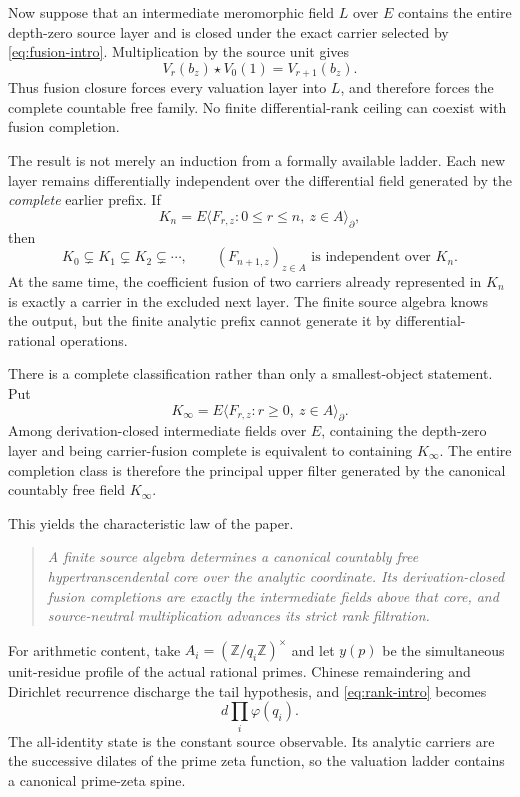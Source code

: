 \documentclass[11pt]{article}
\theoremstyle{definition}
\theoremstyle{remark}
\newcommand{\diff}{\partial}
\begin{document}
Now suppose that an intermediate meromorphic field \(L\) over \(E\) contains the entire
depth-zero source layer and is closed under the exact carrier selected by
\eqref{eq:fusion-intro}.  Multiplication by the source unit gives
\begin{equation}\label{eq:vacuum-intro}
 V_r(b_z)\star V_0(1)=V_{r+1}(b_z).
\end{equation}
Thus fusion closure forces every valuation layer into \(L\), and therefore forces the complete
countable free family.  No finite differential-rank ceiling can coexist with fusion completion.

The result is not merely an induction from a formally available ladder.  Each new layer remains
differentially independent over the differential field generated by the \emph{complete} earlier
prefix.  If
\[
 K_n=E\langle F_{r,z}:0\leq r\leq n,\ z\in A\rangle_{\diff},
\]
then
\begin{equation}\label{eq:strict-intro}
 K_0\subsetneq K_1\subsetneq K_2\subsetneq\cdots,
 \qquad
 (F_{n+1,z})_{z\in A}\text{ is independent over }K_n.
\end{equation}
At the same time, the coefficient fusion of two carriers already represented in \(K_n\) is
exactly a carrier in the excluded next layer.  The finite source algebra knows the output, but
the finite analytic prefix cannot generate it by differential-rational operations.

There is a complete classification rather than only a smallest-object statement.  Put
\[
 K_\infty=E\langle F_{r,z}:r\geq0,\ z\in A\rangle_{\diff}.
\]
Among derivation-closed intermediate fields over \(E\), containing the depth-zero layer and being
carrier-fusion complete is equivalent to containing \(K_\infty\).  The entire completion class is
therefore the principal upper filter generated by the canonical countably free field
\(K_\infty\).

This yields the characteristic law of the paper.

\begin{quote}
\emph{A finite source algebra determines a canonical countably free hypertranscendental core over
the analytic coordinate.  Its derivation-closed fusion completions are exactly the intermediate
fields above that core, and source-neutral multiplication advances its strict rank filtration.}
\end{quote}

For arithmetic content, take \(A_i=(\mathbb Z/q_i\mathbb Z)^\times\) and let \(y(p)\) be the
simultaneous unit-residue profile of the actual rational primes.  Chinese remaindering and
Dirichlet recurrence discharge the tail hypothesis, and \eqref{eq:rank-intro} becomes
\[
 d\prod_i\varphi(q_i).
\]
The all-identity state is the constant source observable.  Its analytic carriers are the
successive dilates of the prime zeta function, so the valuation ladder contains a canonical
prime-zeta spine.
\end{document}
